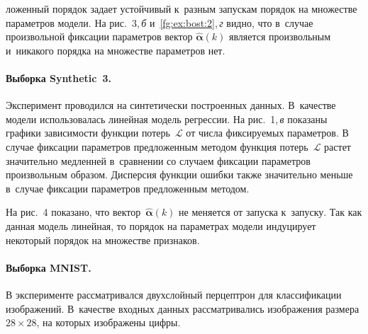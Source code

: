 \begin{multicols}{2}

\noindent
ложенный порядок задает 
устойчивый к~разным запускам порядок на множестве параметров модели. На 
рис.~3,\,\textit{б} и~\ref{fg:ex:bost:2},\,\textit{г} 
видно, что в~случае произвольной фиксации параметров вектор 
$\hat{\boldsymbol{\alpha}}(k)$ является произвольным и~никакого порядка 
на множестве параметров нет.




\paragraph*{Выборка Synthetic~3.}
Эксперимент проводился на синтетически построенных данных. В~качестве 
модели использовалась линейная модель регрессии.
На рис.~1,\,\textit{в} показаны графики зависимости функции 
потерь~$\mathcal{L}$ от числа фиксируемых параметров. В случае фиксации 
параметров предложенным методом функция потерь~$\mathcal{L}$ растет 
значительно медленней в~сравнении со случаем фиксации па\-ра\-мет\-ров 
произвольным образом. Дисперсия функции ошибки также значительно меньше 
в~случае фиксации параметров предложенным методом.





На рис.~4 показано, что 
вектор~$\hat{\boldsymbol{\alpha}}(k)$ не меняется от запуска к~запуску. 
Так как данная модель линейная, то порядок на параметрах модели 
индуцирует некоторый порядок на множестве признаков.

\paragraph*{Выборка MNIST.}
В эксперименте рассматривался двухслойный перцептрон для классификации 
изоб\-ра\-же\-ний. В~качестве входных данных рассматривались изображения 
размера $28\times28$, на которых изображены цифры.


\begin{figure*} %
\vspace*{1pt}
 \begin{center}
 \mbox{%
 \epsfxsize=159.749mm 
 }
 \end{center}
\vspace*{-9pt}
\label{fg:ex:mnist:2}
\end{figure*}



\end{multicols}
